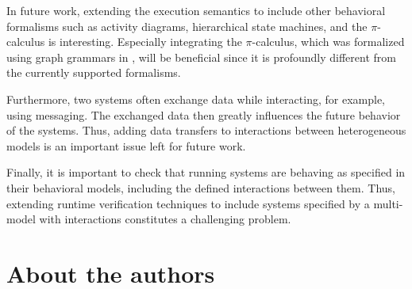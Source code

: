 \documentclass{jot}
\begin{document}
In future work, extending the execution semantics to include other behavioral formalisms such as activity diagrams, hierarchical state machines, and the $\pi$-calculus is interesting.
Especially integrating the $\pi$-calculus, which was formalized using graph grammars in \cite{gadducciGraphRewritingPcalculus2007}, will be beneficial since it is profoundly different from the currently supported formalisms.

Furthermore, two systems often exchange data while interacting, for example, using messaging.
The exchanged data then greatly influences the future behavior of the systems.
Thus, adding data transfers to interactions between heterogeneous models is an important issue left for future work.

Finally, it is important to check that running systems are behaving as specified in their behavioral models, including the defined interactions between them.
Thus, extending runtime verification techniques to include systems specified by a multi-model with interactions constitutes a challenging problem.


\section*{About the authors}


\end{document}

